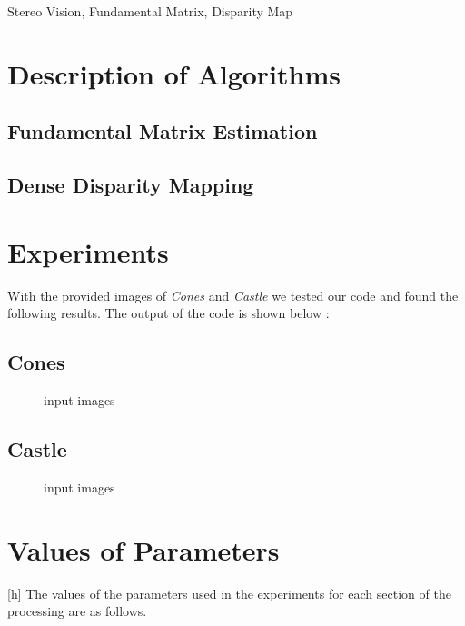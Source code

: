 \documentclass[conference]{IEEEtran}
\begin{document}
\begin{IEEEkeywords}
Stereo Vision, Fundamental Matrix, Disparity Map
\end{IEEEkeywords}

\section{Description of Algorithms}

\subsection{Fundamental Matrix Estimation}\label{AA}


\subsection{Dense Disparity Mapping}\label{AA}

\section{Experiments}
With the provided images of \textit{Cones} and \textit{Castle} we tested our code and found the following results. The output of the code is shown below :

\subsection{Cones}\label{AA}
\begin{figure}[H]
\centering
{}
\vspace{-0.3cm}
\caption{input images}
\label{fig}
\end{figure}

\subsection{Castle}\label{AA}
\begin{figure}[H]
\centering
{}
\vspace{-0.3cm}
\caption{input images}
\label{fig}
\end{figure}

\section{Values of Parameters}[h]
The values of the parameters used in the experiments for each section of the processing are as follows.
\end{document}
